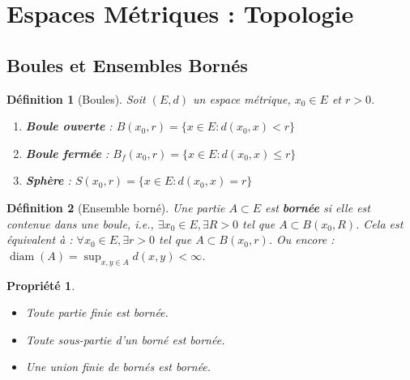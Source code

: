 \documentclass[a4paper]{article}
\newtheorem{definition}{Définition}[section]
\newtheorem{propriete}{Propriété}[section] %
\begin{document}
\section{Espaces Métriques : Topologie}
\subsection{Boules et Ensembles Bornés}
\begin{definition}[Boules]
    Soit \((E, d)\) un espace métrique, \(x_0 \in E\) et \(r > 0\).
    \begin{enumerate}
        \item \textbf{Boule ouverte} : \(B(x_0, r) = \{ x \in E : d(x_0, x) < r \}\)
        \item \textbf{Boule fermée} : \(B_f(x_0, r) = \{ x \in E : d(x_0, x) \le r \}\)
        \item \textbf{Sphère} : \(S(x_0, r) = \{ x \in E : d(x_0, x) = r \}\)
    \end{enumerate}
\end{definition}
\begin{definition}[Ensemble borné]
    Une partie \(A \subset E\) est \textbf{bornée} si elle est contenue dans une boule, i.e., \(\exists x_0 \in E, \exists R > 0\) tel que \(A \subset B(x_0, R)\).
    Cela est équivalent à : \(\forall x_0 \in E, \exists r > 0\) tel que \(A \subset B(x_0, r)\).
    Ou encore : \(\operatorname{diam}(A) = \sup_{x,y \in A} d(x,y) < \infty\).
\end{definition}
\begin{propriete}
    \begin{itemize}
        \item Toute partie finie est bornée.
        \item Toute sous-partie d'un borné est bornée.
        \item Une union finie de bornés est bornée.
    \end{itemize}
\end{propriete}
\end{document}
